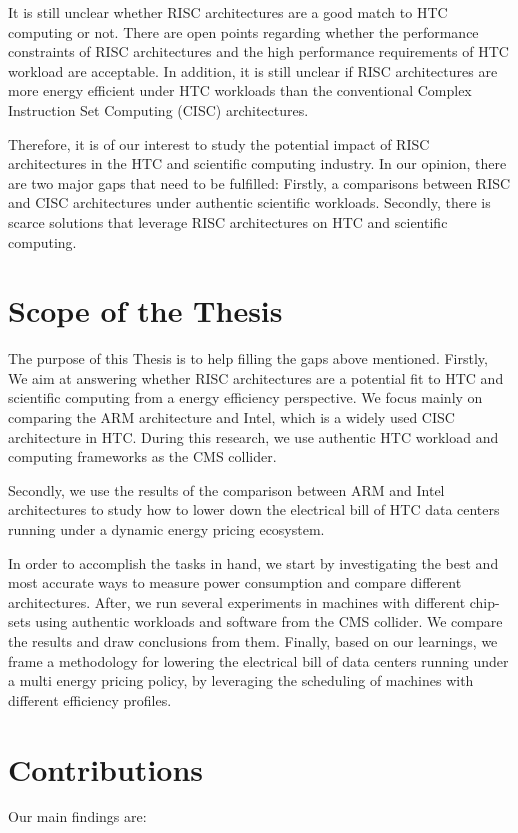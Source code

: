 It is still unclear whether RISC architectures are a good match to HTC
computing or not. There are open points regarding whether the performance 
constraints of RISC architectures and the high performance requirements of HTC 
workload are acceptable. In addition, it is still unclear if RISC architectures
are more energy efficient under HTC workloads than the conventional Complex 
Instruction Set Computing (CISC) architectures.

Therefore, it is of our interest to study the potential impact of RISC architectures in 
the HTC and scientific computing industry. In our opinion, there are two major
gaps that need to be fulfilled: Firstly, a comparisons between
RISC and CISC architectures under authentic scientific workloads. Secondly,
there is scarce solutions that leverage RISC architectures on HTC and scientific
computing.
 

\section{Scope of the Thesis}
The purpose of this Thesis is to help filling the gaps above mentioned. Firstly, We aim at answering whether RISC architectures
are a potential fit to HTC and scientific computing from a energy efficiency
perspective. We focus mainly on comparing the ARM architecture and Intel, which is a widely used CISC architecture in HTC. During this research, we
use authentic HTC workload and computing frameworks as the CMS collider. 

Secondly, we use the results of the comparison between ARM and Intel architectures to study how to lower down the electrical bill of HTC data centers running under a dynamic energy
pricing ecosystem.


In order to accomplish the tasks in hand, we start by investigating the best
and most accurate ways to measure power consumption and compare different
architectures. After, we run several experiments in machines with different chip-sets using
authentic workloads and software from the CMS collider. We compare the results and
draw conclusions from them. Finally, based on our learnings, we frame a methodology for
lowering the electrical bill of data centers running under a multi energy
pricing policy, by leveraging the scheduling of machines with different
efficiency profiles.  

   
\section{Contributions}
Our main findings are: 

